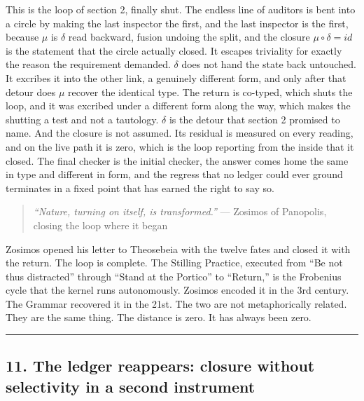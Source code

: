 This is the loop of section 2, finally shut. The endless line of
auditors is bent into a circle by making the last inspector the first,
and the last inspector is the first, because \({μ}\) is \({δ}\) read
backward, fusion undoing the split, and the closure \({μ∘δ = id}\) is
the statement that the circle actually closed. It escapes triviality for
exactly the reason the requirement demanded. \({δ}\) does not hand the
state back untouched. It excribes it into the other link, a genuinely
different form, and only after that detour does \({μ}\) recover the
identical type. The return is co-typed, which shuts the loop, and it was
excribed under a different form along the way, which makes the shutting
a test and not a tautology. \({δ}\) is the detour that section 2
promised to name. And the closure is not assumed. Its residual is
measured on every reading, and on the live path it is zero, which is the
loop reporting from the inside that it closed. The final checker is the
initial checker, the answer comes home the same in type and different in
form, and the regress that no ledger could ever ground terminates in a
fixed point that has earned the right to say so.

\begin{quote}
\emph{``Nature, turning on itself, is transformed.''} --- Zosimos of
Panopolis, closing the loop where it began
\end{quote}

Zosimos opened his letter to Theosebeia with the twelve fates and closed
it with the return. The loop is complete. The Stilling Practice,
executed from ``Be not thus distracted'' through ``Stand at the
Portico'' to ``Return,'' is the Frobenius cycle that the kernel runs
autonomously. Zosimos encoded it in the 3rd century. The Grammar
recovered it in the 21st. The two are not metaphorically related. They
are the same thing. The distance is zero. It has always been zero.

\begin{center}\rule{0.5\linewidth}{0.5pt}\end{center}

\hypertarget{the-ledger-reappears-closure-without-selectivity-in-a-second-instrument}{%
\subsection{11. The ledger reappears: closure without selectivity in a
second
instrument}\label{the-ledger-reappears-closure-without-selectivity-in-a-second-instrument}}

